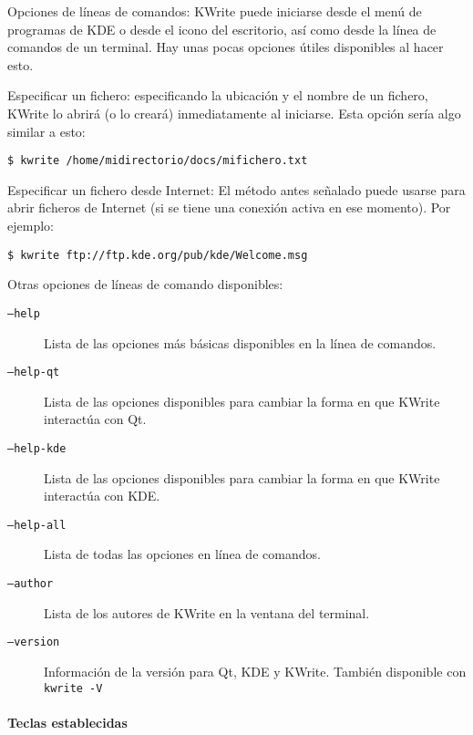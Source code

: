 Opciones de líneas de comandos:  {\sf KWrite} puede iniciarse desde el
menú de  programas de {\sf KDE}  o desde el icono  del escritorio, así
como  desde la  línea  de  comandos de  un  terminal.  Hay unas  pocas
opciones útiles disponibles al hacer esto.

Especificar un fichero:  especificando la ubicación y el  nombre de un
fichero,  {\sf  KWrite} lo  abrirá  (o  lo creará)  inmediatamente  al
iniciarse. Esta opción sería algo similar a esto:

\begin{verbatim}
$ kwrite /home/midirectorio/docs/mifichero.txt
\end{verbatim}

Especificar un fichero desde Internet:  El método antes señalado puede
usarse  para abrir  ficheros de  Internet  (si se  tiene una  conexión
activa en ese momento). Por ejemplo:

\begin{verbatim}
$ kwrite ftp://ftp.kde.org/pub/kde/Welcome.msg
\end{verbatim}

Otras opciones de líneas de comando disponibles:

\begin{description}

\item[{\tt --help}] Lista  de las opciones más  básicas disponibles en
la línea de comandos.

\item[{\tt --help-qt}] Lista de  las opciones disponibles para cambiar
la forma en que {\sf KWrite} interactúa con {\sf Qt}.

\item[{\tt --help-kde}] Lista de las opciones disponibles para cambiar
la forma en que {\sf KWrite} interactúa con {\sf KDE}.

\item[{\tt  --help-all}]  Lista de  todas  las  opciones en  línea  de
comandos.

\item[{\tt  --author}] Lista  de los  autores  de {\sf  KWrite} en  la
ventana del terminal.

\item[{\tt --version}] Información  de la versión para  {\sf Qt}, {\sf
KDE} y {\sf KWrite}. También disponible con {\tt kwrite -V}

\end{description}

\paragraph{Teclas establecidas}

